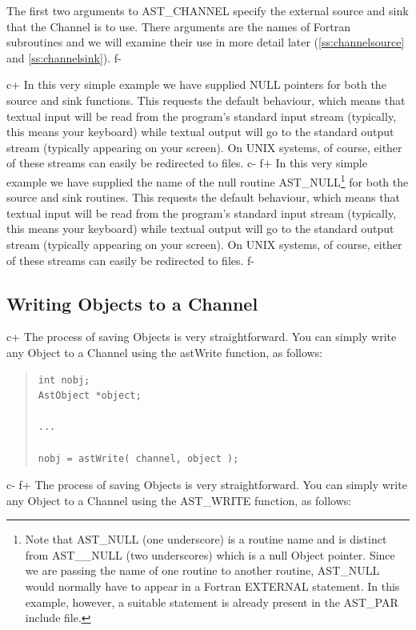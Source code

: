 \documentclass[twoside,11pt]{article}
\newcommand{\secref}[1]{\S\ref{#1}}
\renewcommand{\secref}[1]{\ref{#1}}
\begin{document}
The first two arguments to AST\_CHANNEL specify the external source
and sink that the Channel is to use. There arguments are the names of
Fortran subroutines and we will examine their use in more detail later
(\secref{ss:channelsource} and \secref{ss:channelsink}).
f-

c+
In this very simple example we have supplied NULL pointers for both
the source and sink functions. This requests the default behaviour,
which means that textual input will be read from the program's
standard input stream (typically, this means your keyboard) while
textual output will go to the standard output stream (typically
appearing on your screen). On UNIX systems, of course, either of these
streams can easily be redirected to files.
c-
f+
In this very simple example we have supplied the name of the null
routine AST\_NULL\footnote{Note that AST\_NULL (one underscore) is a
routine name and is distinct from AST\_\_NULL (two underscores) which
is a null Object pointer.  Since we are passing the name of one
routine to another routine, AST\_NULL would normally have to appear in
a Fortran EXTERNAL statement. In this example, however, a suitable
statement is already present in the AST\_PAR include file.} for both
the source and sink routines.  This requests the default behaviour,
which means that textual input will be read from the program's
standard input stream (typically, this means your keyboard) while
textual output will go to the standard output stream (typically
appearing on your screen). On UNIX systems, of course, either of these
streams can easily be redirected to files.
f-

\subsection{\label{ss:writingtoachannel}Writing Objects to a Channel}

c+
The process of saving Objects is very straightforward. You can
simply write any Object to a Channel using the astWrite
function, as follows:

\begin{quote}
\small
\begin{verbatim}
int nobj;
AstObject *object;

...

nobj = astWrite( channel, object );
\end{verbatim}
\normalsize
\end{quote}
c-
f+
The process of saving Objects is very straightforward. You can
simply write any Object to a Channel using the AST\_WRITE
function, as follows:
\end{document}
